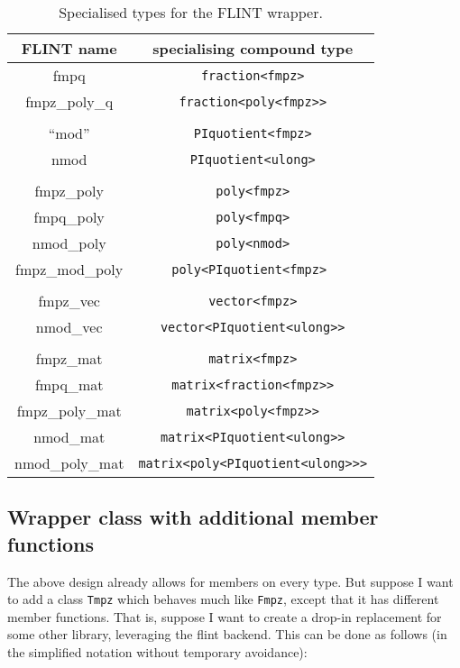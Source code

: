\documentclass{scrartcl}
\begin{document}
\begin{table}[h]
\begin{center}
\begin{tabular}{cc}
FLINT name & specialising compound type \\
\hline
fmpq & \texttt{fraction<fmpz>} \\
fmpz\_poly\_q & \texttt{fraction<poly<fmpz>>} \\
\\
``mod'' & \texttt{PIquotient<fmpz>} \\
nmod & \texttt{PIquotient<ulong>} \\
\\
fmpz\_poly & \texttt{poly<fmpz>} \\
fmpq\_poly & \texttt{poly<fmpq>} \\
nmod\_poly & \texttt{poly<nmod>} \\
fmpz\_mod\_poly & \texttt{poly<PIquotient<fmpz> } \\
\\
fmpz\_vec & \texttt{vector<fmpz>} \\
nmod\_vec & \texttt{vector<PIquotient<ulong>>} \\
\\
fmpz\_mat & \texttt{matrix<fmpz>} \\
fmpq\_mat & \texttt{matrix<fraction<fmpz>>} \\
fmpz\_poly\_mat & \texttt{matrix<poly<fmpz>>} \\
nmod\_mat & \texttt{matrix<PIquotient<ulong>>} \\
nmod\_poly\_mat & \texttt{matrix<poly<PIquotient<ulong>>>}
\end{tabular}
\end{center}
\caption{Specialised types for the FLINT wrapper.}
\label{tab:specialised-types}
\end{table}

\subsection*{Wrapper class with additional member functions}

The above design already allows for members on every type. But suppose I
want to add a class \texttt{Tmpz} which behaves much
like \texttt{Fmpz}, except that it has different member functions. That is,
suppose I want to create a drop-in replacement for some other library,
leveraging the flint backend. This can be done as follows (in the
simplified notation without temporary avoidance):
\end{document}
